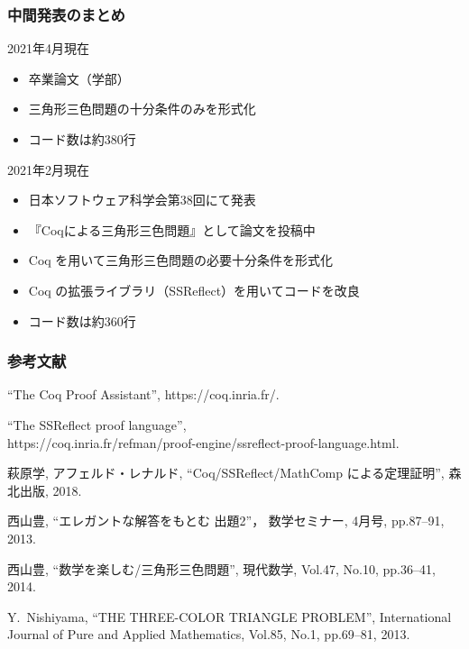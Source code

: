 \documentclass[dvipdfmx,cjk]{beamer}
\begin{document}
\begin{frame}
  \frametitle{中間発表のまとめ}
  \begin{exampleblock}{2021年4月現在}
    \begin{itemize}
    \item 卒業論文（学部）
    \item 三角形三色問題の十分条件のみを形式化
    \item コード数は約380行  
    \end{itemize}
  \end{exampleblock}
  \vfill
  \begin{block}{2021年2月現在}
    \begin{itemize}
    \item
      日本ソフトウェア科学会第38回にて発表
    \item
      『Coqによる三角形三色問題』として論文を投稿中
    \item
      Coq を用いて三角形三色問題の必要十分条件を形式化
    \item
      Coq の拡張ライブラリ（SSReflect）を用いてコードを改良
    \item
      コード数は約360行
    \end{itemize}
  \end{block}
  \vfill
\end{frame}

\begin{frame}
  \frametitle{参考文献}
  \begin{thebibliography}{99}
    ``The Coq Proof Assistant'',
    https://coq.inria.fr/. 

    ``The SSReflect proof language'',
    \\
    https://coq.inria.fr/refman/proof-engine/ssreflect-proof-language.html. 
    
    萩原学, アフェルド・レナルド, 
    ``Coq/SSReflect/MathComp による定理証明'',
    森北出版,
    2018. 
    
    西山豊,
    ``エレガントな解答をもとむ 出題2''，
    数学セミナー,
    4月号, pp.87--91, 2013.
    
    西山豊,
    ``数学を楽しむ/三角形三色問題'',
    現代数学,
    Vol.47, No.10, pp.36--41, 2014.
    
    Y.~Nishiyama,
    ``THE THREE-COLOR TRIANGLE PROBLEM'', 
    International Journal of Pure and Applied Mathematics,
    Vol.85, No.1, pp.69--81, 2013.
  \end{thebibliography}
\end{frame}
\end{document}
